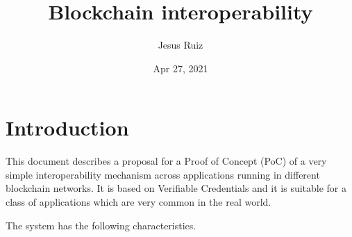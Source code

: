 \documentclass[a4paper,12pt,english]{sphinxhowto}
\title{Blockchain interoperability}
\date{Apr 27, 2021}
\author{Jesus Ruiz}
\begin{document}
\pagestyle{empty}
\sphinxmaketitle
\pagestyle{plain}
\sphinxtableofcontents
\pagestyle{normal}
\label{\detokenize{index::doc}}



\section{Introduction}
\label{\detokenize{ssi/introduction:introduction}}\label{\detokenize{ssi/introduction::doc}}
\sphinxAtStartPar
This document describes a proposal for a Proof of Concept (PoC) of a very simple interoperability mechanism across applications running in different blockchain networks.
It is based on Verifiable Credentials and it is suitable for a class of applications which are very common in the real world.

\sphinxAtStartPar
The system has the following characteristics.
\end{document}
